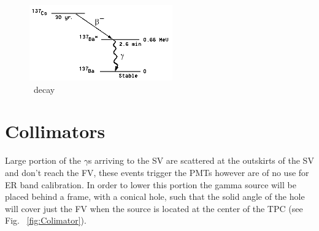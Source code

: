 \begin{figure}
	\begin{center}
	\includegraphics[width=0.55\textwidth, height= 0.3\textheight]{figs/Cs137.png}%
		\caption{\label{fig:Cs} \Cs\ decay}
		\end{center}
	
	\end{figure} 

\section{Collimators} \label{sec:Col}
 
Large portion of the $\gamma$s arriving to the SV are scattered at the outskirts of the SV and don't reach the FV, these events trigger the PMTs however are of no use for ER band calibration. In order to lower this portion the gamma source will be placed behind a frame, with a conical hole, such that the solid angle of the hole will cover just the FV when the source is located at the center of the TPC (see Fig. ~\ref{fig:Colimator}). 

